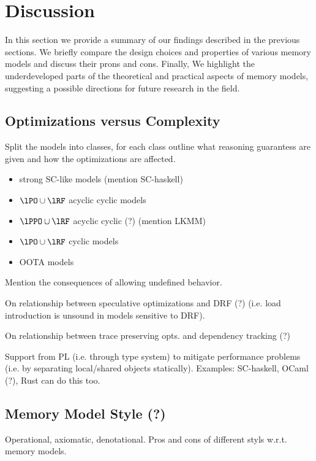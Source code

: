 \section{Discussion}

In this section we provide a summary of our findings  
described in the previous sections. 
We briefly compare the design choices and properties 
of various memory models and discuss their prons and cons.
Finally, We highlight the underdeveloped parts of the theoretical
and practical aspects of memory models, suggesting 
a possible directions for future research in the field. 

\subsection{Optimizations versus Complexity} 

Split the models into classes, for each class 
outline what reasoning guarantess are given and  
how the optimizations are affected.

\begin{itemize}
  \item strong SC-like models (mention SC-haskell)
  \item $\lPO \cup \lRF$ acyclic cyclic models
  \item $\lPPO \cup \lRF$ acyclic cyclic (?) (mention LKMM)
  \item $\lPO \cup \lRF$ cyclic models
  \item OOTA models
\end{itemize}

Mention the consequences of allowing undefined behavior.

On relationship between speculative optimizations and DRF (?)
(i.e. load introduction is unsound in models sensitive to DRF).

On relationship between trace preserving opts. and dependency tracking (?)

Support from PL (i.e. through type system) to mitigate performance problems 
(i.e. by separating local/shared objects statically). 
Examples: SC-haskell, OCaml (?), Rust can do this too. 

\subsection{Memory Model Style (?)}

Operational, axiomatic, denotational. 
Pros and cons of different styls w.r.t. memory models. 


